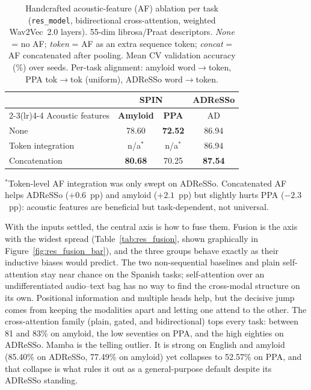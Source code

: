 \begin{table}[htbp]
\centering
\caption[Handcrafted acoustic-feature ablation per task]{Handcrafted acoustic-feature (AF) ablation per task (\texttt{res\_model}, bidirectional cross-attention, weighted Wav2Vec~2.0 layers). 55-dim librosa/Praat descriptors. \emph{None} = no AF; \emph{token} = AF as an extra sequence token; \emph{concat} = AF concatenated after pooling. Mean CV validation accuracy (\%) over seeds. Per-task alignment: amyloid word$\rightarrow$token, PPA tok$\rightarrow$tok (uniform), ADReSSo word$\rightarrow$token.}
\label{tab:res_acoustic}
\small
\begin{tabular}{lccc}
\toprule
 & \multicolumn{2}{c}{\textbf{SPIN}} & \textbf{ADReSSo} \\
\cmidrule(lr){2-3}\cmidrule(lr){4-4}
Acoustic features & \textbf{Amyloid} & \textbf{PPA} & AD \\
\midrule
None              & 78.60 & \textbf{72.52} & 86.94 \\
Token integration & n/a$^{\ast}$ & n/a$^{\ast}$ & 86.94 \\
Concatenation     & \textbf{80.68} & 70.25 & \textbf{87.54} \\
\bottomrule
\end{tabular}

\vspace{2pt}
{\footnotesize $^{\ast}$Token-level AF integration was only swept on ADReSSo. Concatenated AF helps ADReSSo ($+0.6$~pp) and amyloid ($+2.1$~pp) but slightly hurts PPA ($-2.3$~pp): acoustic features are beneficial but task-dependent, not universal.}
\end{table}

With the inputs settled, the central axis is how to fuse them. Fusion is the axis with the widest spread (Table~\ref{tab:res_fusion}, shown graphically in Figure~\ref{fig:res_fusion_bar}), and the three groups behave exactly as their inductive biases would predict. The two non-sequential baselines and plain self-attention stay near chance on the Spanish tasks; self-attention over an undifferentiated audio--text bag has no way to find the cross-modal structure on its own. Positional information and multiple heads help, but the decisive jump comes from keeping the modalities apart and letting one attend to the other. The cross-attention family (plain, gated, and bidirectional) tops every task: between 81 and 83\% on amyloid, the low seventies on PPA, and the high eighties on ADReSSo. Mamba is the telling outlier. It is strong on English and amyloid (85.40\% on ADReSSo, 77.49\% on amyloid) yet collapses to 52.57\% on PPA, and that collapse is what rules it out as a general-purpose default despite its ADReSSo standing.

